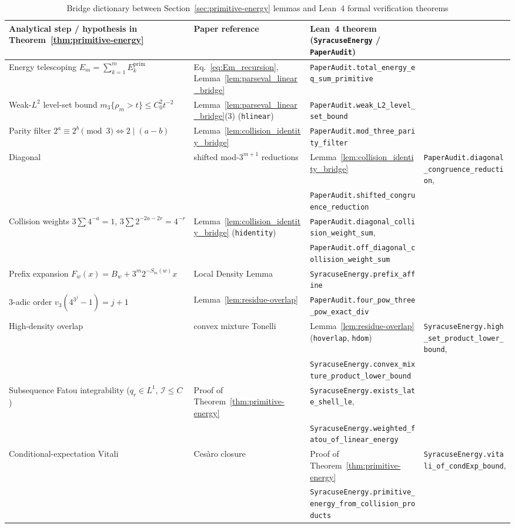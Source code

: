 \documentclass[11pt,a4paper]{article}
\numberwithin{equation}{section}
\theoremstyle{definition}
\theoremstyle{remark}
\newcommand{\cI}{\mathcal{I}}
\newcommand{\prim}{\mathrm{prim}}
\begin{document}
\begin{table}[htbp]
\centering
\caption{Bridge dictionary between Section~\ref{sec:primitive-energy} lemmas and Lean~4 formal verification theorems}
\label{tab:lean_bridge}
\small
\setlength{\tabcolsep}{4pt}
\begin{tabular}{@{}lll@{}}
\toprule
Analytical step / hypothesis in Theorem~\ref{thm:primitive-energy} & Paper reference & Lean~4 theorem (\texttt{SyracuseEnergy} / \texttt{PaperAudit}) \\
\midrule
Energy telescoping $E_m = \sum_{k=1}^m E_k^{\prim}$ & Eq.~\eqref{eq:Em_recursion}, Lemma~\ref{lem:parseval_linear_bridge} & \texttt{PaperAudit.total\_energy\_eq\_sum\_primitive} \\
Weak-$L^2$ level-set bound $m_3\{\rho_m>t\}\le C_0^2 t^{-2}$ & Lemma~\ref{lem:parseval_linear_bridge}(3) (\texttt{hlinear}) & \texttt{PaperAudit.weak\_L2\_level\_set\_bound} \\
Parity filter $2^a \equiv 2^b \pmod 3 \iff 2 \mid (a-b)$ & Lemma~\ref{lem:collision_identity_bridge} & \texttt{PaperAudit.mod\_three\_parity\_filter} \\
Diagonal & shifted mod-$3^{m+1}$ reductions & Lemma~\ref{lem:collision_identity_bridge} & \texttt{PaperAudit.diagonal\_congruence\_reduction}, \\
& & \texttt{PaperAudit.shifted\_congruence\_reduction} \\
Collision weights $3\sum 4^{-a}=1$, $3\sum 2^{-2a-2r}=4^{-r}$ & Lemma~\ref{lem:collision_identity_bridge} (\texttt{hidentity}) & \texttt{PaperAudit.diagonal\_collision\_weight\_sum}, \\
& & \texttt{PaperAudit.off\_diagonal\_collision\_weight\_sum} \\
Prefix expansion $F_w(x) = B_w + 3^m 2^{-S_m(w)}x$ & Local Density Lemma & \texttt{SyracuseEnergy.prefix\_affine} \\
$3$-adic order $v_3(4^{3^j}-1) = j+1$ & Lemma~\ref{lem:residue-overlap} & \texttt{PaperAudit.four\_pow\_three\_pow\_exact\_div} \\
High-density overlap & convex mixture Tonelli & Lemma~\ref{lem:residue-overlap} (\texttt{hoverlap}, \texttt{hdom}) & \texttt{SyracuseEnergy.high\_set\_product\_lower\_bound}, \\
& & \texttt{SyracuseEnergy.convex\_mixture\_product\_lower\_bound} \\
Subsequence Fatou integrability ($q_r \in L^1$, $\cI \le C$) & Proof of Theorem~\ref{thm:primitive-energy} & \texttt{SyracuseEnergy.exists\_late\_shell\_le}, \\
& & \texttt{SyracuseEnergy.weighted\_fatou\_of\_linear\_energy} \\
Conditional-expectation Vitali & Ces\`aro closure & Proof of Theorem~\ref{thm:primitive-energy} & \texttt{SyracuseEnergy.vitali\_of\_condExp\_bound}, \\
& & \texttt{SyracuseEnergy.primitive\_energy\_from\_collision\_products} \\
\bottomrule
\end{tabular}
\end{table}
\end{document}
